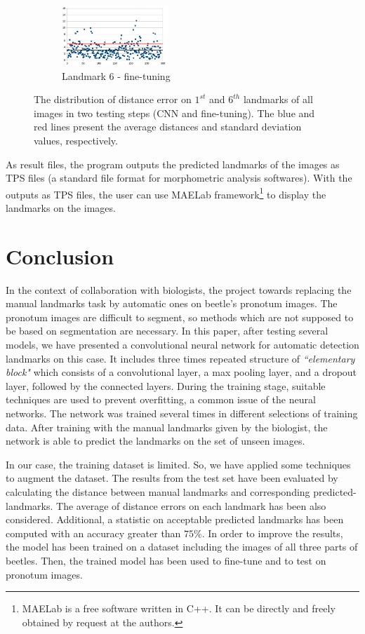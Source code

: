 \documentclass{article} %
\begin{document}
\begin{multicols}{2}
\begin{figure}[H]
    ~ 
    \begin{subfigure}[t]{0.24\textwidth}
        \centering
        \includegraphics[height=0.9in]{images/lm6_finetuning_2}
        \caption{\footnotesize{Landmark 6 - fine-tuning}}
        \label{figsub222}
    \end{subfigure}
    \caption{\footnotesize{The distribution of distance error on $1^{st}$ and $6^{th}$ landmarks of all images in two testing steps (CNN and fine-tuning). The blue and red lines present the average distances and standard deviation values, respectively.}}
    \label{figrsexample2}
\end{figure}

As result files, the program outputs the
predicted landmarks of the images as TPS files (a standard file format for morphometric analysis softwares). With the outputs as TPS files,
the user can use MAELab framework\footnote{MAELab is a free software written in C++. It can be directly and freely
obtained by request at the authors.} to display the
landmarks on the images.

\section{Conclusion}
\label{Secconclusion}
In the context of collaboration with biologists, the project towards replacing the manual landmarks task by automatic ones on beetle's pronotum images. The pronotum images are difficult to segment, so methods which are not supposed to be based on segmentation are necessary. In this paper, after testing several models, we have presented a convolutional neural network for automatic detection landmarks on this case. It includes three times repeated structure of \textit{``elementary block"} which consists of a convolutional layer, a max pooling layer, and a dropout layer, followed by the connected layers. During the training stage, suitable techniques are used to prevent overfitting, a common issue of the neural networks. The network was trained several times in different selections of training data. After training with the manual landmarks given by the biologist, the network is able to predict the landmarks on the set of unseen images.

In our case, the training dataset is limited. So, we have applied some techniques to augment the dataset. The results from the test set have been evaluated by calculating the distance between manual landmarks and corresponding predicted-landmarks. The average of distance errors on each landmark has been also considered. Additional, a statistic on acceptable predicted landmarks has been computed with an accuracy greater than $75\%$. In order to improve the results, the model has been trained on a dataset including the images of all three parts of beetles. Then, the trained model has been used to fine-tune and to test on pronotum images.


\end{multicols}
\end{document}
